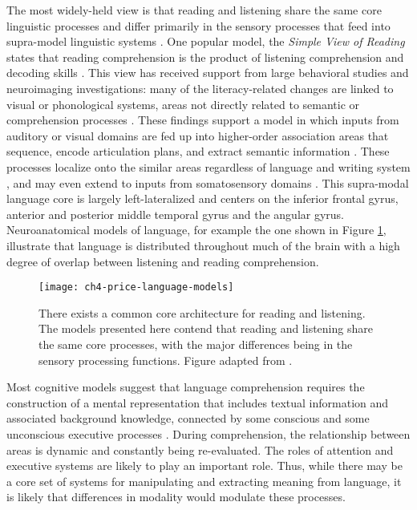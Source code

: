 The most widely-held view is that reading and listening share the same core linguistic processes and differ primarily in the sensory processes that feed into supra-model linguistic systems \citep{Mattingly1971, Price2012}. One popular model, the \textit{Simple View of Reading} states that reading comprehension is the product of listening comprehension and decoding skills \citep{Gough1986}. This view has received support from large behavioral studies \citep{Kirby2008} and neuroimaging investigations: many of the literacy-related changes are linked to visual or phonological systems, areas not directly related to semantic or comprehension processes \citep{Schlaggar2007, Dehaene2015}. These findings support a model in which inputs from auditory or visual domains are fed up into higher-order association areas that sequence, encode articulation plans, and extract semantic information \citep{Price2012}. These processes localize onto the similar areas regardless of language and writing system \citep{Rueckl2015}, and may even extend to inputs from somatosensory domains \citep{Xu2005, Sood2016}. This supra-modal language core is largely left-lateralized and centers on the inferior frontal gyrus, anterior and posterior middle temporal gyrus and the angular gyrus. Neuroanatomical models of language, for example the one shown in Figure \ref{fig:ch4-price-language-models}, illustrate that language is distributed throughout much of the brain with a high degree of overlap between listening and reading comprehension. 

\begin{figure}[t]
	\centering
	\texttt{[image: ch4-price-language-models]}
    \caption[Common core architecture for reading and listening]{There exists a common core architecture for reading and listening. The models presented here contend that reading and listening share the same core processes, with the major differences being in the sensory processing functions. Figure adapted from \citep{Price2012}.}
	\label{fig:ch4-price-language-models}
\end{figure}

Most cognitive models suggest that language comprehension requires the construction of a mental representation that includes textual information and associated background knowledge, connected by some conscious and some unconscious executive processes \citep{Kendeou2014}. During comprehension, the relationship between areas is dynamic and constantly being re-evaluated. The roles of attention and executive systems are likely to play an important role. Thus, while there may be a core set of systems for manipulating and extracting meaning from language, it is likely that differences in modality would modulate these processes. 

